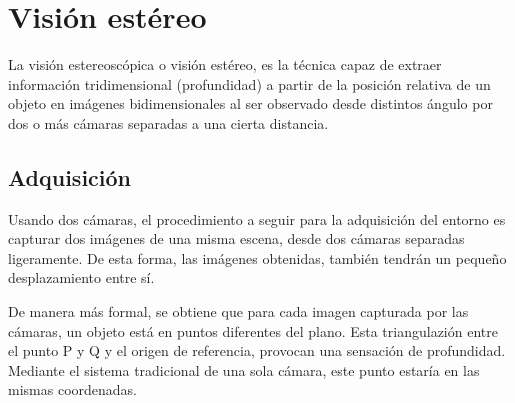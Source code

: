 





\section{Visión estéreo}
\label{2:sec:2}

La visión estereoscópica o visión estéreo, es la técnica capaz de extraer
información tridimensional (profundidad) a partir de la posición relativa de un
objeto en imágenes bidimensionales al ser observado desde distintos ángulo por
dos o más cámaras separadas a una cierta distancia.

\subsection{Adquisición}

Usando dos cámaras, el procedimiento a seguir para la adquisición del entorno es
capturar dos imágenes de una misma escena, desde dos cámaras separadas
ligeramente. De esta forma, las imágenes obtenidas, también tendrán un pequeño 
desplazamiento entre sí.

De manera más formal, se obtiene que para cada imagen capturada por las
cámaras, un objeto está en puntos diferentes del plano. Esta triangulazión
entre el punto P y Q y el origen de referencia, provocan una sensación de
profundidad. Mediante el sistema tradicional de una sola cámara, este punto
estaría en las mismas coordenadas.

